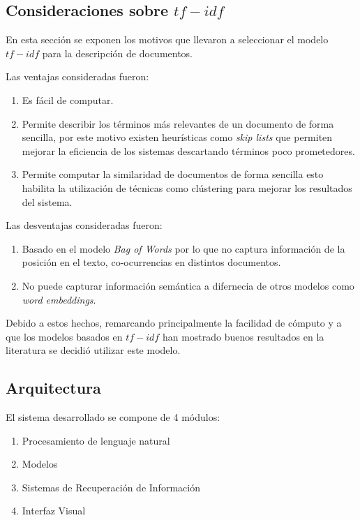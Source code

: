 \documentclass[a4paper,10pt,twocolumn]{article}
\begin{document}
    \subsection{Consideraciones sobre $tf-idf$ }
    En esta secci\'on se exponen los motivos que llevaron a seleccionar el modelo
    $tf-idf$ para la descripci\'on de documentos.

    Las ventajas consideradas fueron:
    \begin{enumerate}
        \item Es f\'acil de computar.
        \item Permite describir los t\'erminos m\'as relevantes de un documento de forma sencilla, por este
        motivo existen heur\'isticas como \textit{skip lists} que permiten mejorar la eficiencia de los sistemas
        descartando t\'erminos poco prometedores.
        \item Permite computar la similaridad de documentos de forma sencilla esto habilita la
        utilizaci\'on de t\'ecnicas como cl\'ustering para mejorar los resultados del sistema.
    \end{enumerate}

    Las desventajas consideradas fueron:
    \begin{enumerate}
        \item Basado en el modelo \textit{Bag of Words} por lo que no captura informaci\'on de la posici\'on
        en el texto,  co-ocurrencias en distintos documentos.
        \item No puede capturar informaci\'on sem\'antica a difernecia de otros modelos como \textit{word embeddings}.
    \end{enumerate}

    Debido a estos hechos, remarcando principalmente la facilidad de c\'omputo y a que los modelos basados en $tf-idf$ han mostrado buenos resultados en la
    literatura se decidi\'o utilizar este modelo.

  	\subsection{Arquitectura}\label{sub:results}
	El sistema desarrollado se compone de 4 m\'odulos:
    
    \begin{enumerate}
        \item Procesamiento de lenguaje natural
        \item Modelos
        \item Sistemas de Recuperaci\'on de Informaci\'on
        \item Interfaz Visual
    \end{enumerate}
    
\end{document}
